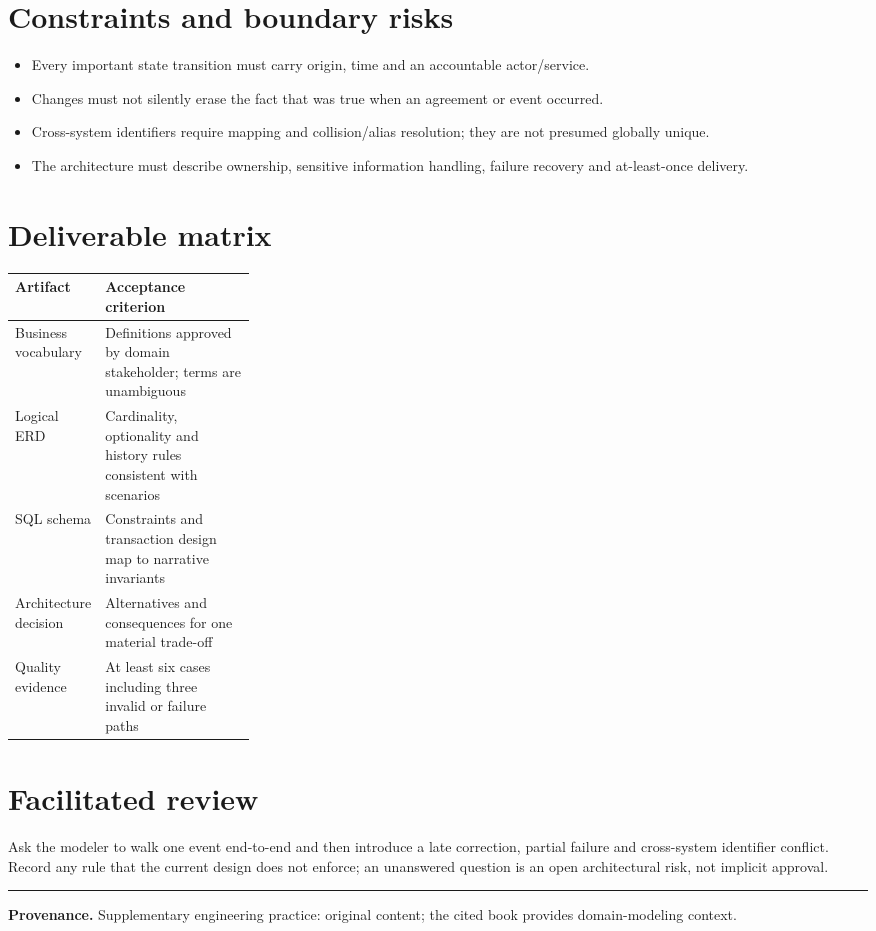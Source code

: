\documentclass[11pt,letterpaper]{article}
\begin{document}
\section{Constraints and boundary risks}
\begin{itemize}
\item Every important state transition must carry origin, time and an accountable actor/service.
\item Changes must not silently erase the fact that was true when an agreement or event occurred.
\item Cross-system identifiers require mapping and collision/alias resolution; they are not presumed globally unique.
\item The architecture must describe ownership, sensitive information handling, failure recovery and at-least-once delivery.
\end{itemize}

\section{Deliverable matrix}
\begin{tabularx}{\linewidth}{@{}>{\raggedright\arraybackslash}p{0.28\linewidth}>{\raggedright\arraybackslash}X@{}}
\toprule
\textbf{Artifact} & \textbf{Acceptance criterion} \\ 
\midrule
Business vocabulary & Definitions approved by domain stakeholder; terms are unambiguous \\ 
Logical ERD & Cardinality, optionality and history rules consistent with scenarios \\ 
SQL schema & Constraints and transaction design map to narrative invariants \\ 
Architecture decision & Alternatives and consequences for one material trade-off \\ 
Quality evidence & At least six cases including three invalid or failure paths \\ 
\bottomrule
\end{tabularx}

\section{Facilitated review}
Ask the modeler to walk one event end-to-end and then introduce a late correction, partial failure and cross-system identifier conflict. Record any rule that the current design does not enforce; an unanswered question is an open architectural risk, not implicit approval.


\vfill
\hrule
{\footnotesize\textbf{Provenance.} Supplementary engineering practice: original content; the cited book provides domain-modeling context.}
\end{document}

